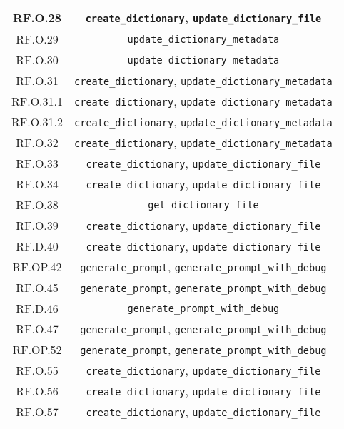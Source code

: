 \begin{adjustwidth}{-0.5cm}{-0.5cm}
\begin{longtable}{|c|c|}
    \hline RF.O.28 & \texttt{create\_dictionary}, \texttt{update\_dictionary\_file} \\
    \hline RF.O.29 & \texttt{update\_dictionary\_metadata} \\
    \hline RF.O.30 & \texttt{update\_dictionary\_metadata} \\
    \hline RF.O.31 & \texttt{create\_dictionary}, \texttt{update\_dictionary\_metadata} \\
    \hline RF.O.31.1 & \texttt{create\_dictionary}, \texttt{update\_dictionary\_metadata} \\
    \hline RF.O.31.2 & \texttt{create\_dictionary}, \texttt{update\_dictionary\_metadata} \\
    \hline RF.O.32 & \texttt{create\_dictionary}, \texttt{update\_dictionary\_metadata} \\
    \hline RF.O.33 & \texttt{create\_dictionary}, \texttt{update\_dictionary\_file} \\
    \hline RF.O.34 & \texttt{create\_dictionary}, \texttt{update\_dictionary\_file} \\
    \hline RF.O.38 & \texttt{get\_dictionary\_file} \\
    \hline RF.O.39 & \texttt{create\_dictionary}, \texttt{update\_dictionary\_file} \\
    \hline RF.D.40 & \texttt{create\_dictionary}, \texttt{update\_dictionary\_file} \\
    \hline RF.OP.42 & \texttt{generate\_prompt}, \texttt{generate\_prompt\_with\_debug} \\
    \hline RF.O.45 & \texttt{generate\_prompt}, \texttt{generate\_prompt\_with\_debug} \\
    \hline RF.D.46 & \texttt{generate\_prompt\_with\_debug} \\
    \hline RF.O.47 & \texttt{generate\_prompt}, \texttt{generate\_prompt\_with\_debug} \\
    \hline RF.OP.52 & \texttt{generate\_prompt}, \texttt{generate\_prompt\_with\_debug} \\
    \hline RF.O.55 & \texttt{create\_dictionary}, \texttt{update\_dictionary\_file} \\
    \hline RF.O.56 & \texttt{create\_dictionary}, \texttt{update\_dictionary\_file} \\
    \hline RF.O.57 & \texttt{create\_dictionary}, \texttt{update\_dictionary\_file} \\
  \end{longtable}
\end{adjustwidth}
\egroup
